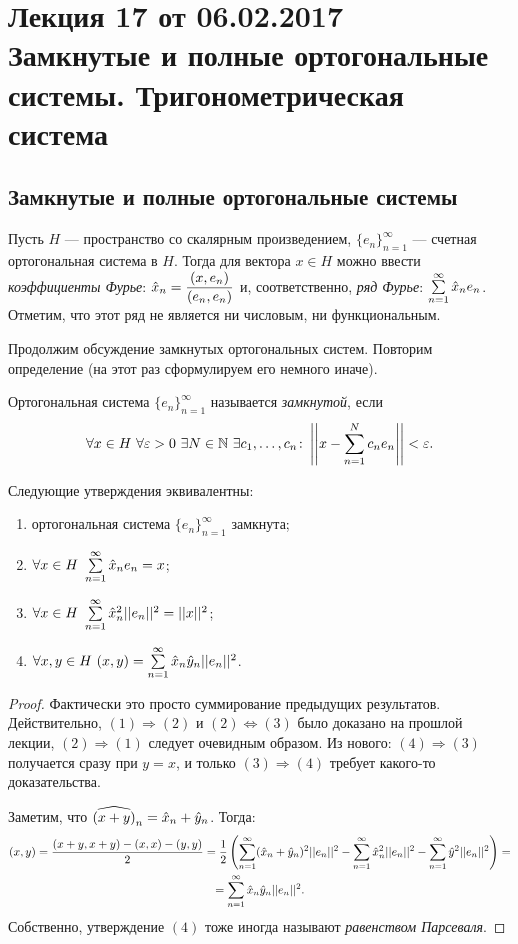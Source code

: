 \section{Лекция 17 от 06.02.2017 \\ Замкнутые и полные ортогональные системы. Тригонометрическая система}
\subsection{Замкнутые и полные ортогональные системы}
Пусть $H$ --- пространство со скалярным произведением, $\{e_n\}_{n=1}^{\infty}$  --- счетная ортогональная система в $H$. Тогда для вектора $x \in H$ можно ввести \textit{коэффициенты Фурье}: $\hat{x}_n = \dfrac{(x, e_n)}{(e_n, e_n)}$ и, соответственно, \textit{ряд Фурье}: $\sum\limits_{n=1}^{\infty} \hat{x}_ne_n $. Отметим, что этот ряд не является ни числовым, ни функциональным.

Продолжим обсуждение замкнутых ортогональных систем. Повторим определение (на этот раз сформулируем его немного иначе).
\begin{Def}
Ортогональная система $\{e_n\}_{n=1}^{\infty}$ называется \textit{замкнутой}, если
$$
\forall x \in H \ \forall \varepsilon > 0 \ \exists N \in \mathbb{N} \ \exists c_1, \ldots, c_n \colon \left|\left|x - \sum\limits_{n=1}^{N}c_ne_n\right|\right| < \varepsilon.
$$
\end{Def}

\begin{Theorem}
Следующие утверждения эквивалентны:
\begin{enumerate}
\item ортогональная система $\{e_n\}_{n=1}^{\infty}$ замкнута;
\item $\forall x \in H \  \sum\limits_{n=1}^{\infty}\hat{x}_ne_n = x$;
\item $\forall x \in H \ \sum\limits_{n=1}^{\infty} \hat{x}^2_n||e_n||^2 = ||x||^2 $;
\item $\forall x, y \in H \ (x, y) = \sum\limits_{n=1}^{\infty} \hat{x}_n\hat{y}_n||e_n||^2$.
\end{enumerate}
\end{Theorem}
\begin{proof}
Фактически это просто суммирование предыдущих результатов. Действительно, $(1) \Rightarrow (2)$ и $(2) \Leftrightarrow (3)$ было доказано на прошлой лекции, $(2) \Rightarrow (1)$ следует очевидным образом.  Из нового: $(4) \Rightarrow (3)$ получается сразу при $y = x$, и только $(3) \Rightarrow (4)$ требует какого-то доказательства.

Заметим, что $\widehat{(x + y)}_n = \hat{x}_n + \hat{y}_n$. Тогда:
\begin{gather*}
(x, y) = \frac{(x + y, x+y) - (x, x) - (y, y)}{2} = \frac{1}{2} \left( \sum\limits_{n=1}^{\infty} (\hat{x}_n + \hat{y}_n)^2 ||e_n||^2 - \sum\limits_{n=1}^{\infty} \hat{x}_n^2||e_n||^2 - \sum\limits_{n=1}^{\infty} \hat{y}^2||e_n||^2 \right) = \\ = \sum\limits_{n=1}^{\infty} \hat{x}_n\hat{y}_n||e_n||^2.
\end{gather*}
Собственно, утверждение $(4)$ тоже иногда называют \textit{равенством Парсеваля}.
\end{proof}

